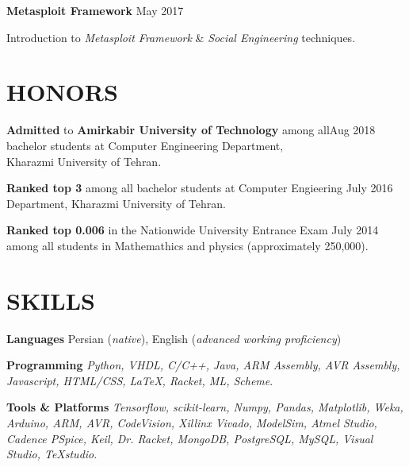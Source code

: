 \documentclass[margin, 10pt]{res} %
\begin{document}
\begin{resume}
	\textbf{Metasploit Framework}
	\hfill {May 2017}
		\vspace{0.15cm}
	\begin{innerlist}
		\item Introduction to \textit{Metasploit Framework} \& \textit{Social Engineering} techniques.
	\end{innerlist}
  	\vspace{0.5cm}
	\section{HONORS}
	\textbf{Admitted} to 
	\textbf{Amirkabir University of Technology}
	among all\hfill {Aug 2018}\\ bachelor students at Computer Engineering 
	Department,\\ Kharazmi University of Tehran.
	
	\textbf{Ranked top 3}
	among all bachelor students at Computer Engieering \hfill {July 2016}\\ Department, Kharazmi University of Tehran.
	
	\textbf{Ranked top 0.006}
	in the Nationwide University Entrance Exam \hfill {July 2014}\\ among all students in 
	Mathemathics and physics (approximately 250,000).
    \end{resume}
  	\vspace{0.5cm}
	\section{SKILLS}
	
	\textbf{Languages }
	Persian (\emph{native}), English (\emph{advanced working proficiency})
	
	\textbf{Programming}
	\textit{Python, VHDL, C/C++, Java, ARM Assembly, AVR Assembly, Javascript, HTML/CSS, \LaTeX, Racket, ML, Scheme}.
	
	\textbf{Tools \& Platforms}
	\textit{Tensorflow, scikit-learn, Numpy, Pandas, Matplotlib, Weka, Arduino, ARM, AVR, CodeVision, Xillinx Vivado, ModelSim, Atmel Studio, Cadence PSpice, Keil, Dr. Racket, MongoDB, PostgreSQL, MySQL, Visual Studio, TeXstudio}.
	  	\vspace{0.5cm}
\end{document}
